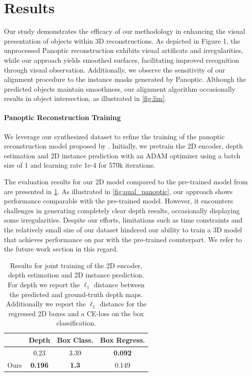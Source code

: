 \section{Results}
\label{sec:results}
Our study demonstrates the efficacy of our methodology in enhancing the visual presentation of objects within 3D reconstructions. As depicted in Figure 1, the unprocessed Panoptic reconstruction exhibits visual artificats and irregularities, while our approach yields smoothed surfaces, facilitating improved recognition through visual observation. Additionally, we observe the sensitivity of our alignment procedure to the instance masks generated by Panoptic. Although the predicted objects maintain smoothness, our alignment algorithm occasionally results in object intersection, as illustrated in \cref{fig:lim}.

\paragraph{Panoptic Reconstruction Training}

We leverage our synthesized dataset to refine the training of the panoptic reconstruction model proposed by \citet{dahnert2021panoptic}.
Initially, we pretrain the 2D encoder, depth estimation and 2D instance prediction with an ADAM optimizer using a batch size of 1 and learning rate 1e-4 for 570k iterations.

The evaluation results for our 2D model compared to the pre-trained model from \citet{dahnert2021panoptic} are presented in \cref{tab:2dresults}.
As illustrated in \cref{fig:qual_panoptic}, our approach shows performance comparable with the pre-trained model. However, it encounters challenges in generating completely clear depth results, occasionally displaying some irregularities.
Despite our efforts, limitations such as time constraints and the relatively small size of our dataset hindered our ability to train a 3D model that achieves performance on par with the pre-trained counterpart. We refer to the future work section in this regard.
\begin{table}
  \centering
  \begin{tabular}{@{}lccc@{}}
    \toprule
     & Depth & Box Class. & Box Regress. \\
    \midrule
    \citet{dahnert2021panoptic} & 0.23 & 3.39 & \textbf{0.092}\\
    Ours & \textbf{0.196} & \textbf{1.3} & 0.149 \\
    \bottomrule
  \end{tabular}
  \caption{Results for joint training of the 2D encoder, depth estimation and 2D instance prediction. For depth we report the $\ell_1$ distance between the predicted and ground-truth depth maps. Additionally we report the $\ell_1$ distance for the regressed 2D boxes and a CE-loss on the box classification.  }
  \label{tab:2dresults}
\end{table}

